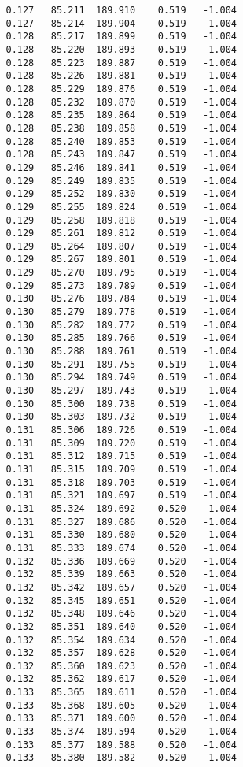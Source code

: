 \begin{verbatim}
   0.127   85.211  189.910    0.519   -1.004
   0.127   85.214  189.904    0.519   -1.004
   0.128   85.217  189.899    0.519   -1.004
   0.128   85.220  189.893    0.519   -1.004
   0.128   85.223  189.887    0.519   -1.004
   0.128   85.226  189.881    0.519   -1.004
   0.128   85.229  189.876    0.519   -1.004
   0.128   85.232  189.870    0.519   -1.004
   0.128   85.235  189.864    0.519   -1.004
   0.128   85.238  189.858    0.519   -1.004
   0.128   85.240  189.853    0.519   -1.004
   0.128   85.243  189.847    0.519   -1.004
   0.129   85.246  189.841    0.519   -1.004
   0.129   85.249  189.835    0.519   -1.004
   0.129   85.252  189.830    0.519   -1.004
   0.129   85.255  189.824    0.519   -1.004
   0.129   85.258  189.818    0.519   -1.004
   0.129   85.261  189.812    0.519   -1.004
   0.129   85.264  189.807    0.519   -1.004
   0.129   85.267  189.801    0.519   -1.004
   0.129   85.270  189.795    0.519   -1.004
   0.129   85.273  189.789    0.519   -1.004
   0.130   85.276  189.784    0.519   -1.004
   0.130   85.279  189.778    0.519   -1.004
   0.130   85.282  189.772    0.519   -1.004
   0.130   85.285  189.766    0.519   -1.004
   0.130   85.288  189.761    0.519   -1.004
   0.130   85.291  189.755    0.519   -1.004
   0.130   85.294  189.749    0.519   -1.004
   0.130   85.297  189.743    0.519   -1.004
   0.130   85.300  189.738    0.519   -1.004
   0.130   85.303  189.732    0.519   -1.004
   0.131   85.306  189.726    0.519   -1.004
   0.131   85.309  189.720    0.519   -1.004
   0.131   85.312  189.715    0.519   -1.004
   0.131   85.315  189.709    0.519   -1.004
   0.131   85.318  189.703    0.519   -1.004
   0.131   85.321  189.697    0.519   -1.004
   0.131   85.324  189.692    0.520   -1.004
   0.131   85.327  189.686    0.520   -1.004
   0.131   85.330  189.680    0.520   -1.004
   0.131   85.333  189.674    0.520   -1.004
   0.132   85.336  189.669    0.520   -1.004
   0.132   85.339  189.663    0.520   -1.004
   0.132   85.342  189.657    0.520   -1.004
   0.132   85.345  189.651    0.520   -1.004
   0.132   85.348  189.646    0.520   -1.004
   0.132   85.351  189.640    0.520   -1.004
   0.132   85.354  189.634    0.520   -1.004
   0.132   85.357  189.628    0.520   -1.004
   0.132   85.360  189.623    0.520   -1.004
   0.132   85.362  189.617    0.520   -1.004
   0.133   85.365  189.611    0.520   -1.004
   0.133   85.368  189.605    0.520   -1.004
   0.133   85.371  189.600    0.520   -1.004
   0.133   85.374  189.594    0.520   -1.004
   0.133   85.377  189.588    0.520   -1.004
   0.133   85.380  189.582    0.520   -1.004

\end{verbatim}
